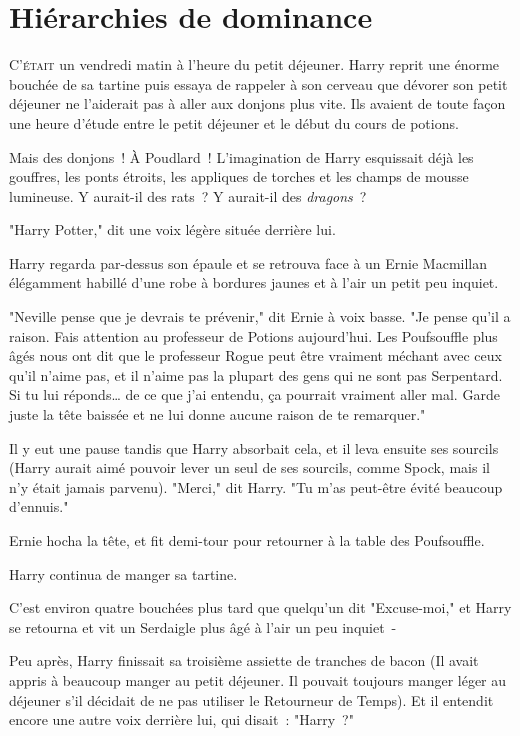 \chapter{Hiérarchies de dominance}

\lettrine{C}{'était} un vendredi matin à l'heure du petit déjeuner. Harry reprit une énorme bouchée de sa tartine puis essaya de rappeler à son cerveau que dévorer son petit déjeuner ne l'aiderait pas à aller aux donjons plus vite. Ils avaient de toute façon une heure d'étude entre le petit déjeuner et le début du cours de potions.

Mais des donjons~! À Poudlard~! L'imagination de Harry esquissait déjà les gouffres, les ponts étroits, les appliques de torches et les champs de mousse lumineuse. Y aurait-il des rats~? Y aurait-il des \emph{dragons}~?

"Harry Potter," dit une voix légère située derrière lui.

Harry regarda par-dessus son épaule et se retrouva face à un Ernie Macmillan élégamment habillé d’une robe à bordures jaunes et à l'air un petit peu inquiet.

"Neville pense que je devrais te prévenir," dit Ernie à voix basse. "Je pense qu'il a raison. Fais attention au professeur de Potions aujourd'hui. Les Poufsouffle plus âgés nous ont dit que le professeur Rogue peut être vraiment méchant avec ceux qu'il n'aime pas, et il n'aime pas la plupart des gens qui ne sont pas Serpentard. Si tu lui réponds… de ce que j'ai entendu, ça pourrait vraiment aller mal. Garde juste la tête baissée et ne lui donne aucune raison de te remarquer."

Il y eut une pause tandis que Harry absorbait cela, et il leva ensuite ses sourcils (Harry aurait aimé pouvoir lever un seul de ses sourcils, comme Spock, mais il n'y était jamais parvenu). "Merci," dit Harry. "Tu m'as peut-être évité beaucoup d'ennuis."

Ernie hocha la tête, et fit demi-tour pour retourner à la table des Poufsouffle.

Harry continua de manger sa tartine.

C'est environ quatre bouchées plus tard que quelqu'un dit "Excuse-moi," et Harry se retourna et vit un Serdaigle plus âgé à l'air un peu inquiet~-

Peu après, Harry finissait sa troisième assiette de tranches de bacon (Il avait appris à beaucoup manger au petit déjeuner. Il pouvait toujours manger léger au déjeuner s'il décidait de ne pas utiliser le Retourneur de Temps). Et il entendit encore une autre voix derrière lui, qui disait~: "Harry~?"

